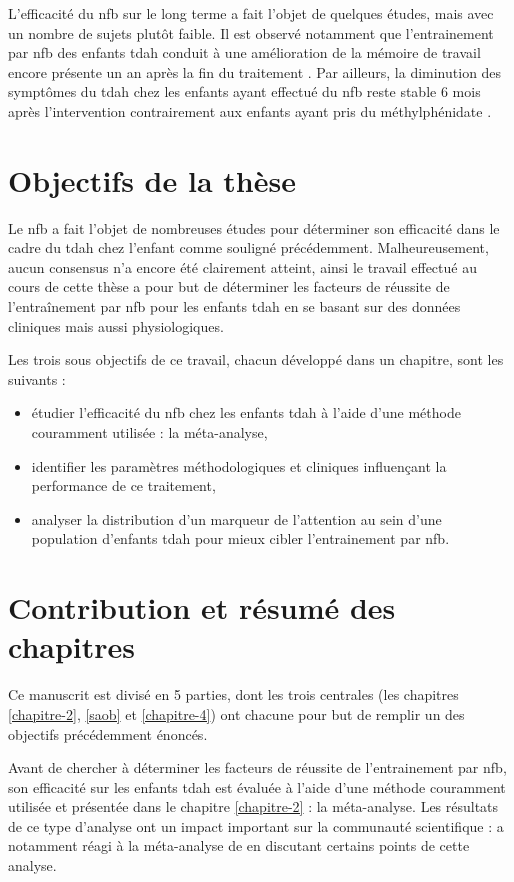 L'efficacité du \gls{nfb} sur le long terme a fait l'objet de quelques études, mais avec un nombre de sujets plutôt faible. Il est observé notamment
que l'entrainement par \gls{nfb} des enfants \gls{tdah} conduit à une amélioration de la mémoire de travail encore présente un an après la fin du traitement
\citep{Dobrakowski2019}. Par ailleurs, la diminution des symptômes du \gls{tdah} chez les enfants ayant effectué du \gls{nfb} reste stable 6 mois après 
l'intervention contrairement aux enfants ayant pris du méthylphénidate \citep{Gelade2018}. 


\section{Objectifs de la thèse}

Le \gls{nfb} a fait l'objet de nombreuses études pour déterminer son efficacité dans le cadre du \gls{tdah} chez l'enfant comme souligné précédemment.
Malheureusement, aucun consensus n'a encore été clairement atteint, ainsi le travail effectué au cours de cette thèse a pour but de déterminer les facteurs 
de réussite de l'entraînement par \gls{nfb} pour les enfants \gls{tdah} en se basant sur des données cliniques mais aussi physiologiques. 

Les trois sous objectifs de ce travail, chacun développé dans un chapitre, sont les suivants :
\begin{itemize}
\item étudier l'efficacité du \gls{nfb} chez les enfants \gls{tdah} à l'aide d'une méthode couramment utilisée : la méta-analyse,
\item identifier les paramètres méthodologiques et cliniques influençant la performance de ce traitement,
\item analyser la distribution d'un marqueur de l'attention au sein d'une population d'enfants \gls{tdah} pour mieux cibler
l'entrainement par \gls{nfb}. 
\end{itemize}

\section{Contribution et résumé des chapitres}

Ce manuscrit est divisé en 5 parties, dont les trois centrales (les chapitres \ref{chapitre-2}, \ref{saob} et \ref{chapitre-4}) ont chacune pour but de remplir 
un des objectifs précédemment énoncés.

Avant de chercher à déterminer les facteurs de réussite de l'entrainement par \gls{nfb}, son efficacité sur les enfants \gls{tdah} est évaluée à l'aide 
d'une méthode couramment utilisée \citep{Sonuga-Barke2013, Micoulaud2014, Cortese2016} et présentée dans le chapitre \ref{chapitre-2} : la méta-analyse. 
Les résultats de ce type d'analyse ont un impact important sur la communauté scientifique : \citet{Micoulaud2016} a notamment réagi à la méta-analyse de 
\citet{Cortese2016} en discutant certains points de cette analyse. 

